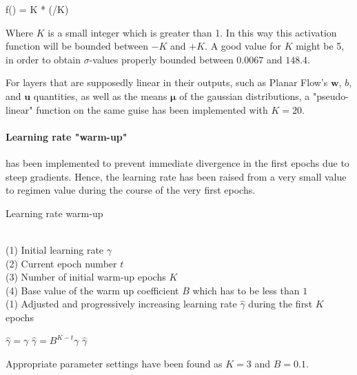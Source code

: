 \begin{nalign}
f() = K * \tanh(/K)
\end{nalign}

Where $K$ is a small integer which is greater than 1. In this way this activation function
will be bounded between $-K$ and $+K$. A good value for $K$ might be 5, in order to obtain
$\sigma$-values properly bounded between $0.0067$ and $148.4$.

For layers that are supposedly linear in their outputs, such as Planar Flow's 
$\mathbf{w}$, $b$, and $\mathbf{u}$ quantities, as well as the means $\boldsymbol\mu$ of 
the gaussian distributions,
a "pseudo-linear" function
on the same guise has been implemented with $K=20$. 

\paragraph{Learning rate "warm-up"} has been implemented to prevent immediate divergence
in the first epochs due to steep gradients. 
Hence, the learning rate has been raised from a very small value
to regimen value during the course of the very first epochs.

\begin{algorithm}
\caption{Learning rate warm-up}
\begin{algorithmic}[1]

\REQUIRE ~~\\
(1) Initial learning rate $\gamma$   \\
(2) Current epoch number $t$ \\
(3) Number of initial warm-up epochs $K$ \\
(4) Base value of the warm up coefficient $B$  which has to be less than $1$
\ENSURE~~\\
(1) Adjusted and progressively increasing learning rate $\hat{\gamma}$ during the first $K$ epochs
\item[]
    \STATE $\hat{\gamma} = \gamma$
\ELSE
    \STATE $\hat{\gamma} = B^{K-t} \gamma$
\ENDIF
\RETURN $\hat{\gamma}$
\end{algorithmic}
\end{algorithm}

Appropriate parameter settings have been found as $K=3$ and $B=0.1$.

